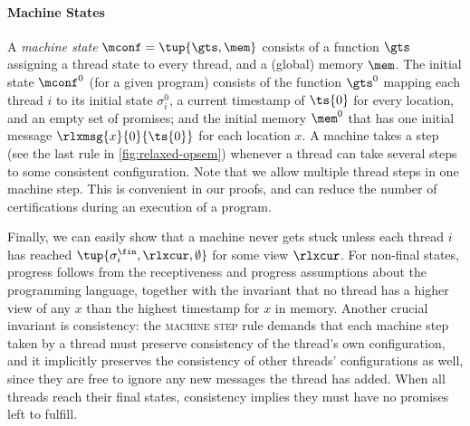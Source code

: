 \paragraph{Machine States}

A \emph{machine state} $\mconf=\tup{\gts,\mem}$ consists of a
function $\gts$ assigning a thread state to every thread, and a (global) memory $\mem$.
The initial state $\mconf^0$ (for a given program) consists of 
the function $\gts^0$ mapping each thread $i$ to its initial state $\sigma_i^0$,
a current timestamp of $\ts{0}$ for every location, and an empty set of promises;
and the initial memory $\mem^0$ that has one initial message $\rlxmsg{x}{0}{\ts{0}}$ for each location $x$.
A machine takes a step (see the last rule in \cref{fig:relaxed-opsem})
whenever a thread can take several steps to some consistent configuration.
Note that we allow multiple thread steps in one machine step.
This is convenient in our proofs,
and can reduce the number of certifications during an execution of a program.

Finally, we can easily show that a machine never gets stuck unless
each thread $i$ has reached $\tup{\sigma_i^\fin,\rlxcur,\emptyset}$
for some view $\rlxcur$.  For non-final states, progress follows from
the receptiveness and progress assumptions about the programming
language, together with the invariant that no thread has a higher view
of any $x$ than the highest timestamp for $x$ in memory.  Another
crucial invariant is consistency: the \textsc{machine step} rule
demands that each machine step taken by a thread must preserve
consistency of the thread's own configuration, and it implicitly
preserves the consistency of other threads' configurations as well,
since they are free to ignore any new messages the thread has added.
When all threads reach their final states, consistency implies they
must have no promises left to fulfill.



